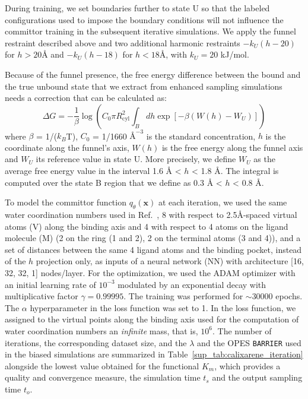             During training, we set boundaries further to state U so that the labeled configurations used to impose the boundary conditions will not influence the committor training in the subsequent iterative simulations.
            We apply the funnel restraint described above and two additional harmonic restraints $-k_U(h-20)$ for $h > 20 \si{\angstrom}$ and $-k_U(h-18)$ for $h < 18 \si{\angstrom}$, with $k_U = 20$ kJ/mol.
        
            Because of the funnel presence, the free energy difference between the bound and the true unbound state that we extract from enhanced sampling simulations needs a correction that can be calculated as:
                \begin{equation}
                    \Delta G = -\frac{1}{\beta} \log \left( C_0 \pi R_{\text{cyl}}^2 \int_B dh \exp\left[-\beta \left(W(h) - W_U\right)\right] \right)
                \end{equation}
            where $\beta$ = 1/($k_B$T), $C_0$ = 1/1660 $\si{\angstrom}^{-3}$ is the standard concentration, $h$ is the coordinate along the funnel’s axis, $W(h)$ is the free energy along the funnel axis and $W_U$ its reference value in state U. 
            More precisely, we define $W_U$ as the average free energy value in the interval 1.6  $\si{\angstrom}$ < $h$ < 1.8  $\si{\angstrom}$.
            The integral is computed over the state B region that we define as 0.3  $\si{\angstrom}$ < $h$ < 0.8  $\si{\angstrom}$.

            To model the committor function $q_\theta(\textbf{x})$ at each iteration, we used the same water coordination numbers used in Ref.~, 8 with respect to 2.5\AA-spaced virtual atoms (V) along the binding axis and 4 with respect to 4 atoms on the ligand molecule (M) (2 on the ring (1 and 2), 2 on the terminal atoms (3 and 4)), and a set of distances between the same 4 ligand atoms and the binding pocket, instead of the $h$ projection only, as inputs of a neural network (NN) with architecture [16, 32, 32, 1] nodes/layer.
            For the optimization, we used the ADAM optimizer with an initial learning rate of $10^{-3}$ modulated by an exponential decay with multiplicative factor $\gamma=0.99995$.
            The training was performed for $\sim$30000 epochs. 
            The $\alpha$ hyperparameter in the loss function was set to 1.
            In the loss function, we assigned to the virtual points along the binding axis used for the computation of water coordination numbers an \emph{infinite} mass, that is, $10^6$.
            The number of iterations, the corresponding dataset size, and the $\lambda$ and the OPES \texttt{BARRIER} used in the biased simulations are summarized in Table~\ref{sup_tab:calixarene_iteration} alongside the lowest value obtained for the functional $K_m$, which provides a quality and convergence measure, the simulation time $t_s$ and the output sampling time $t_o$.

